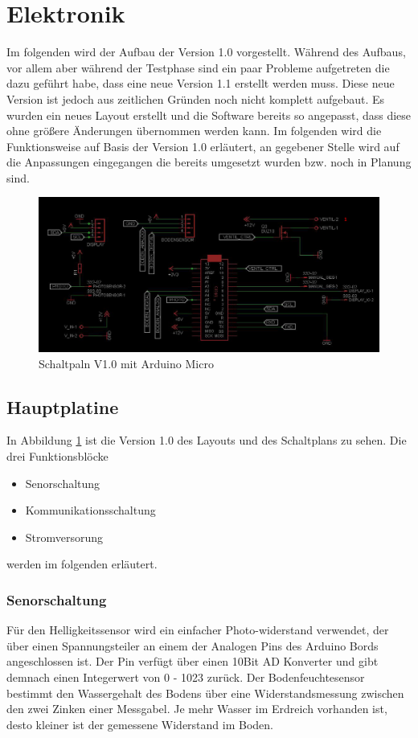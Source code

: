 \documentclass[]{IEEEtran}
\begin{document}
\section{Elektronik}
	Im folgenden wird der Aufbau der Version 1.0 vorgestellt. Während des Aufbaus, vor allem aber während der Testphase sind ein paar Probleme aufgetreten die dazu geführt habe, dass eine neue Version 1.1 erstellt werden muss. 
	Diese neue Version ist jedoch aus zeitlichen Gründen noch nicht komplett aufgebaut. 
	Es wurden ein neues Layout erstellt und die Software bereits so angepasst, dass diese ohne größere Änderungen übernommen werden kann. 
	Im folgenden wird die Funktionsweise auf Basis der Version 1.0 erläutert, an gegebener Stelle wird auf die  Anpassungen eingegangen die bereits umgesetzt wurden bzw. noch in Planung sind. 
\begin{figure}
	\centering
	\includegraphics[width=0.9\linewidth]{bilder/v1SchaltplanMicro0.JPG}
	\caption{Schaltpaln V1.0 mit Arduino Micro}
	\label{fig-Schaltplanv1.0}
\end{figure}

\subsection{Hauptplatine}



In Abbildung \ref{fig-Schaltplanv1.0} ist die Version 1.0 des Layouts und des Schaltplans zu sehen. Die drei Funktionsblöcke
\begin{itemize}
		\item Senorschaltung
		\item Kommunikationsschaltung
		\item Stromversorung
\end{itemize}
werden im folgenden erläutert. 
		
			
\subsubsection{Senorschaltung} \label{sensorik}
Für den Helligkeitssensor wird ein einfacher Photo-widerstand verwendet, der über einen Spannungsteiler an einem der Analogen Pins des Arduino Bords angeschlossen ist. Der Pin verfügt über einen 10Bit AD Konverter und gibt demnach einen Integerwert von 0 - 1023 zurück.
Der Bodenfeuchtesensor bestimmt den Wassergehalt des Bodens über eine Widerstandsmessung zwischen den zwei Zinken einer Messgabel. Je mehr Wasser im Erdreich vorhanden ist, desto kleiner ist der gemessene Widerstand im Boden.
\end{document}
